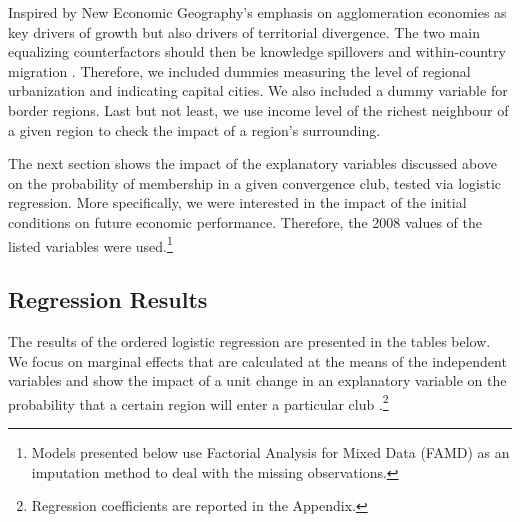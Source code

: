 \documentclass[11pt]{article}
\begin{document}
Inspired by New Economic Geography's emphasis on agglomeration economies as key drivers of growth but also drivers of territorial divergence. The two main equalizing 
counterfactors should then be knowledge spillovers and within-country migration  \citep{iammarino2017regional}. Therefore, we included dummies measuring the level of regional urbanization and indicating capital cities. We also included a dummy variable for border regions. %
Last but not least, we use income level of the richest neighbour of a given region to check the impact of a region's surrounding.

The next section shows the impact of the explanatory variables discussed above on the probability of membership in a given convergence club, tested via logistic regression. More specifically, we were interested in the impact of the initial conditions on future economic performance. Therefore, the 2008 values of the listed variables were used.\footnote{Models presented below use Factorial Analysis for Mixed Data (FAMD) as an imputation method to deal with the missing observations.}

\subsection{Regression Results}

The results of the ordered logistic regression are presented in the tables below. We focus on marginal effects that are calculated at the means of the independent variables and show the impact of a unit change in an explanatory variable on the probability that a certain region will enter a particular club \citep{carrolloglmx}.\footnote{Regression coefficients are reported in the Appendix.}
\end{document}
